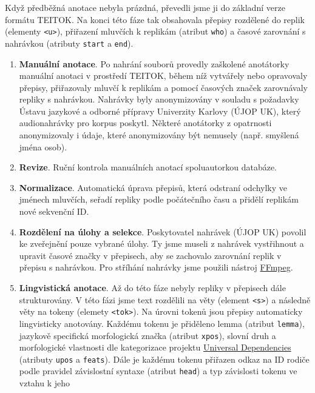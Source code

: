 \documentclass[
]{article}
\begin{document}
Když předběžná anotace nebyla prázdná, převedli jsme ji do základní
verze formátu TEITOK. Na konci této fáze tak obsahovala přepisy
rozdělené do replik (elementy \texttt{\textless{}u\textgreater{}}),
přiřazení mluvčích k replikám (atribut \texttt{who}) a časové zarovnání
s nahrávkou (atributy \texttt{start} a \texttt{end}).

\begin{enumerate}
\def\labelenumi{\arabic{enumi}.}
\setcounter{enumi}{1}
\item
  \textbf{Manuální anotace}. Po nahrání souborů provedly zaškolené
  anotátorky manuální anotaci v prostředí TEITOK, během níž vytvářely
  nebo opravovaly přepisy, přiřazovaly mluvčí k replikám a pomocí
  časových značek zarovnávaly repliky s nahrávkou. Nahrávky byly
  anonymizovány v souladu s požadavky Ústavu jazykové a odborné přípravy
  Univerzity Karlovy (ÚJOP UK), který audionahrávky pro korpus poskytl.
  Některé anotátorky z opatrnosti anonymizovaly i údaje, které
  anonymizovány být nemusely (např. smyšlená jména osob).
\item
  \textbf{Revize}. Ruční kontrola manuálních anotací spoluautorkou
  databáze.
\item
  \textbf{Normalizace}. Automatická úprava přepisů, která odstraní
  odchylky ve jménech mluvčích, seřadí repliky podle počátečního času a
  přidělí replikám nové sekvenční ID.
\item
  \textbf{Rozdělení na úlohy a selekce}. Poskytovatel nahrávek (ÚJOP UK)
  povolil ke zveřejnění pouze vybrané úlohy. Ty jsme museli z nahrávek
  vystřihnout a upravit časové značky v přepisech, aby se zachovalo
  zarovnání replik v přepisu s nahrávkou. Pro stříhání nahrávky jsme
  použili nástroj \href{https://www.ffmpeg.org/}{FFmpeg}.
\item
  \textbf{Lingvistická anotace}. Až do této fáze nebyly repliky v
  přepisech dále strukturovány. V této fázi jsme text rozdělili na věty
  (element \texttt{\textless{}s\textgreater{}}) a následně věty na
  tokeny (elemety \texttt{\textless{}tok\textgreater{}}). Na úrovni
  tokenů jsou přepisy automaticky lingvisticky anotovány. Každému tokenu
  je přiděleno lemma (atribut \texttt{lemma}), jazykově specifická
  morfologická značka (atribut \texttt{xpos}), slovní druh a
  morfologické vlastnosti dle kategorizace projektu
  \href{https://universaldependencies.org/}{Universal Dependencies}
  (atributy \texttt{upos} a \texttt{feats}). Dále je každému tokenu
  přiřazen odkaz na ID rodiče podle pravidel závislostní syntaxe
  (atribut \texttt{head}) a typ závislosti tokenu ve vztahu k jeho

\end{enumerate}
\end{document}
